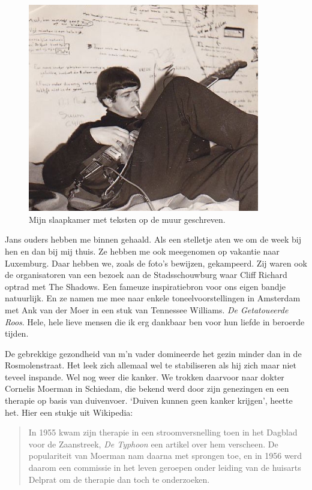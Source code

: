 \documentclass[12pt,twoside, openright]{memoir}
\begin{document}
\begin{figure}
\centering
\includegraphics[width=0.9\textwidth]{img/ch21/gitarist}
\caption*{\footnotesize Mijn slaapkamer met teksten op de muur geschreven.}
\end{figure}

Jans ouders hebben me binnen gehaald. Als een stelletje aten we om de week bij hen en dan bij mij thuis. Ze hebben me ook meegenomen op vakantie naar Luxemburg. Daar hebben we, zoals de foto’s bewijzen, gekampeerd. Zij waren ook de organisatoren van een bezoek aan de Stadsschouwburg waar Cliff Richard optrad met The Shadows. Een fameuze inspiratiebron voor ons eigen bandje natuurlijk. En ze namen me mee naar enkele toneelvoorstellingen in Amsterdam met Ank van der Moer in een stuk van Tennessee Williams. \emph{De Getatoueerde Roos}. Hele, hele lieve mensen die ik erg dankbaar ben voor hun liefde in beroerde tijden. 


De gebrekkige gezondheid van m’n vader domineerde het gezin minder dan in de Rosmolenstraat. Het leek zich allemaal wel te stabiliseren als hij zich maar niet teveel inspande. Wel nog weer die kanker. We trokken daarvoor naar dokter Cornelis Moerman in Schiedam, die bekend werd door zijn genezingen en een therapie op basis van duivenvoer. `Duiven kunnen geen kanker krijgen', heette het. Hier een stukje uit Wikipedia:

\begin{quote}
In 1955 kwam zijn therapie in een stroomversnelling toen in het Dagblad voor de Zaanstreek, \emph{De Typhoon} een artikel over hem verscheen. De populariteit van Moerman nam daarna met sprongen toe, en in 1956 werd daarom een commissie in het leven geroepen onder leiding van de huisarts Delprat om de therapie dan toch te onderzoeken.
\end{quote}
\end{document}

